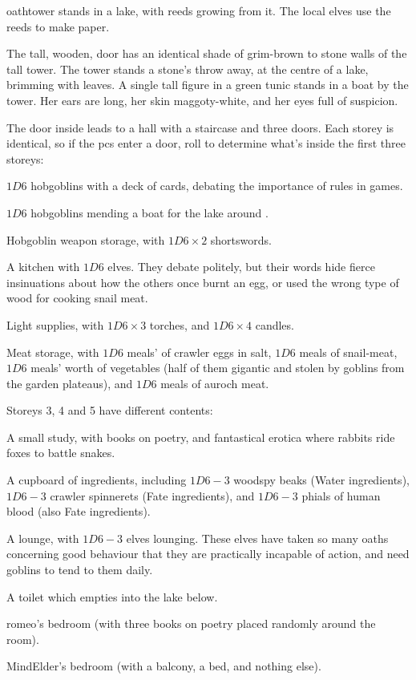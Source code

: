 \begin{multicols}{2}

\Gls{oathtower} stands in a lake, with reeds growing from it.
The local elves use the reeds to make paper.

\begin{boxtext}
  The tall, wooden, door has an identical shade of grim-brown to stone walls of the tall tower.
  The tower stands a stone's throw away, at the centre of a lake, brimming with leaves.
  A single tall figure in a green tunic stands in a boat by the tower.
  Her ears are long, her skin maggoty-white, and her eyes full of suspicion.
\end{boxtext}

The door inside leads to a hall with a staircase and three doors.
Each storey is identical, so if the \glspl{pc} enter a door, roll to determine what's inside the first three storeys:

\begin{dlist}
  \item
  $1D6$ hobgoblins with a deck of cards, debating the importance of rules in games.
  \item
  $1D6$ hobgoblins mending a boat for the lake around .
  \item
  Hobgoblin weapon storage, with $1D6 \times 2$ shortswords.
  \item
  A kitchen with $1D6$ elves.
  They debate politely, but their words hide fierce insinuations about how the others once burnt an egg, or used the wrong type of wood for cooking snail meat.
  \item
  Light supplies, with $1D6 \times 3$ torches, and $1D6 \times 4$ candles.
  \item
  Meat storage, with $1D6$ meals' of \gls{crawler} eggs in salt, $1D6$ meals of snail-meat, $1D6$ meals' worth of vegetables (half of them gigantic and stolen by goblins from the garden plateaus), and $1D6$ meals of auroch meat.
\end{dlist}

Storeys 3, 4 and 5 have different contents:

\begin{dlist}
  \item
  A small study, with books on poetry, and fantastical erotica where rabbits ride foxes to battle snakes.
  \item
  A cupboard of \glspl{ingredient}, including $1D6-3$ woodspy beaks (Water \glspl{ingredient}), $1D6-3$ \gls{crawler} spinnerets (Fate \glspl{ingredient}), and $1D6-3$ phials of human blood (also Fate \glspl{ingredient}).
  \item
  A lounge, with $1D6-3$ elves lounging.
  These elves have taken so many oaths concerning good behaviour that they are practically incapable of action, and need goblins to tend to them daily.
  \item
  A toilet which empties into the lake below.
  \item
  \gls{romeo}'s bedroom (with three books on poetry placed randomly around the room).
  \item
  \gls{MindElder}'s bedroom (with a balcony, a bed, and nothing else).
\end{dlist}


\end{multicols}
